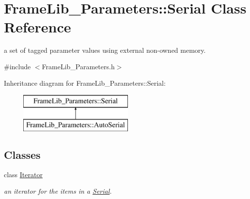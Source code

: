 \hypertarget{class_frame_lib___parameters_1_1_serial}{}\section{Frame\+Lib\+\_\+\+Parameters\+:\+:Serial Class Reference}
\label{class_frame_lib___parameters_1_1_serial}


a set of tagged parameter values using external non-\/owned memory.  




{\ttfamily \#include $<$Frame\+Lib\+\_\+\+Parameters.\+h$>$}

Inheritance diagram for Frame\+Lib\+\_\+\+Parameters\+:\+:Serial\+:\begin{figure}[H]
\begin{center}
\leavevmode
\includegraphics[height=2.000000cm]{class_frame_lib___parameters_1_1_serial}
\end{center}
\end{figure}
\subsection*{Classes}
\begin{DoxyCompactItemize}
\item 
class \hyperlink{class_frame_lib___parameters_1_1_serial_1_1_iterator}{Iterator}
\begin{DoxyCompactList}\small\item\em an iterator for the items in a \hyperlink{class_frame_lib___parameters_1_1_serial}{Serial}. \end{DoxyCompactList}\end{DoxyCompactItemize}
